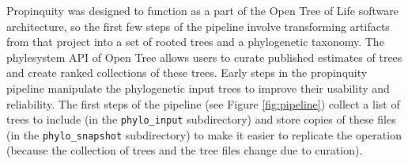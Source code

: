\documentclass[fleqn,12pt,lineno,english]{wlpeerj}
\begin{document}
Propinquity was designed to function as a part of the Open Tree of
Life software architecture, so the first few steps of the pipeline
involve transforming artifacts from that project into a set of rooted
trees and a phylogenetic taxonomy. The phylesystem API \citep{McTavishEtAt2015}
of Open Tree allows users to curate published estimates of trees and
create ranked collections of these trees. Early steps in the propinquity
pipeline manipulate the phylogenetic input trees to improve their
usability and reliability. The first steps of the pipeline (see Figure
\ref{fig:pipeline}) collect a list of trees to include (in the \texttt{phylo\_input}
subdirectory) and store copies of these files (in the \texttt{phylo\_snapshot}
subdirectory) to make it easier to replicate the operation (because
the collection of trees and the tree files change due to curation).
\begin{figure}
\begin{centering}

\end{centering}
\end{figure}
\end{document}
